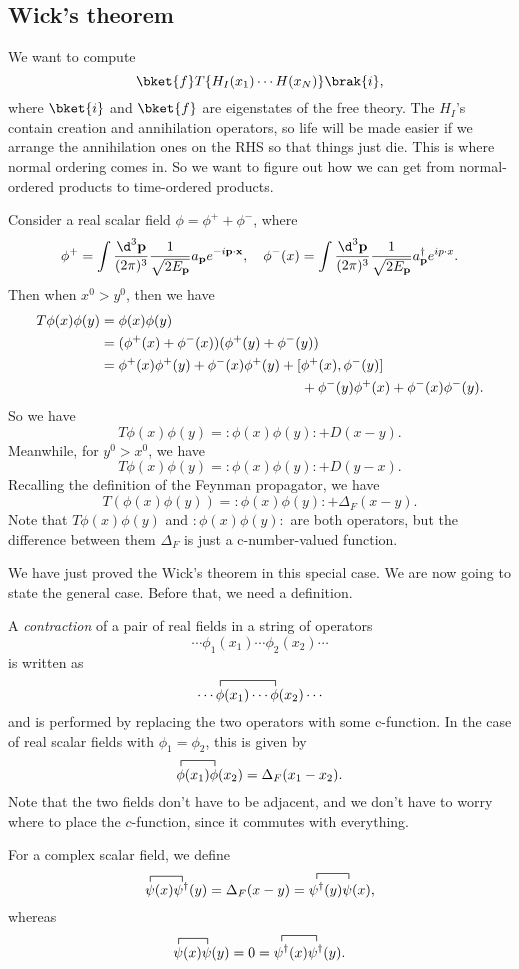 \documentclass[a4paper]{article}
\begin{document}
\subsection{Wick's theorem}
We want to compute
\[
  \bket{f}T\{H_I(x_1) \cdots H(x_N)\}\brak{i},
\]
where $\bket{i}$ and $\bket{f}$ are eigenstates of the free theory. The $H_I$'s contain creation and annihilation operators, so life will be made easier if we arrange the annihilation ones on the RHS so that things just die. This is where normal ordering comes in. So we want to figure out how we can get from normal-ordered products to time-ordered products.

Consider a real scalar field $\phi = \phi^+ + \phi^-$, where
\[
  \phi^+ = \int \frac{\d^3 \mathbf{p}}{(2\pi)^3} \frac{1}{\sqrt{2 E_\mathbf{p}}} a_\mathbf{p} e^{-i\mathbf{p}\cdot \mathbf{x}},\quad \phi^-(x) = \int \frac{\d^3 \mathbf{p}}{(2\pi)^3} \frac{1}{\sqrt{2 E_\mathbf{p}}} a_\mathbf{p}^\dagger e^{ip\cdot x}.
\]
Then when $x^0 > y^0$, then we have
\begin{align*}
  T\phi(x) \phi(y) ={}& \phi(x) \phi(y)\\
  ={}& (\phi^+(x) + \phi^-(x))(\phi^+(y) + \phi^-(y))\\
  ={}& \phi^+(x)\phi^+(y) + \phi^-(x) \phi^+(y) + [\phi^+(x), \phi^-(y)] \\
  &\hphantom{\phi^+(x)\phi^+(y) + \phi^-(x) \phi^+(y) + [}+ \phi^-(y) \phi^+(x) + \phi^-(x) \phi^-(y).
\end{align*}
So we have
\[
  T\phi(x) \phi(y) = :\phi(x) \phi(y): + D(x - y).
\]
Meanwhile, for $y^0 > x^0$, we have
\[
  T\phi(x) \phi(y) = :\phi(x)\phi(y): + D(y - x).
\]
Recalling the definition of the Feynman propagator, we have
\[
  T(\phi(x)\phi(y)) = :\phi(x) \phi(y): + \Delta_F(x - y).
\]
Note that $T \phi(x) \phi(y)$ and $:\phi(x) \phi(y):$ are both operators, but the difference between them $\Delta_F$ is just a c-number-valued function.

We have just proved the Wick's theorem in this special case. We are now going to state the general case. Before that, we need a definition.
\begin{defi}
  A \emph{contraction} of a pair of real fields in a string of operators
  \[
    \cdots\phi_1(x_1) \cdots \phi_2(x_2) \cdots
  \]
  is written as
  \[
    \contraction{\cdots}{\phi}{(x_1) \cdots}{\phi}\cdots\phi(x_1) \cdots \phi(x_2) \cdots
  \]
  and is performed by replacing the two operators with some c-function. In the case of real scalar fields with $\phi_1 = \phi_2$, this is given by
  \[
    \contraction{}{\phi}{(x_1)}{\phi}\phi(x_1)\phi(x_2) = \Delta_F(x_1 - x_2).
  \]
  Note that the two fields don't have to be adjacent, and we don't have to worry where to place the $c$-function, since it commutes with everything.

  For a complex scalar field, we define
  \[
    \contraction{}{\psi}{(x)}{\psi^\dagger}\psi(x) \psi^\dagger(y) = \Delta_F(x - y) = \contraction{}{\psi^\dagger}{(u)}{\psi}\psi^\dagger(y) \psi(x),
  \]
  whereas
  \[
    \contraction{}{\psi}{(x)}{\psi} \psi(x) \psi(y) = 0 =\contraction{}{\psi^\dagger}{(x)}{\psi^\dagger} \psi^\dagger(x) \psi^\dagger(y).
  \]
\end{defi}
\end{document}
